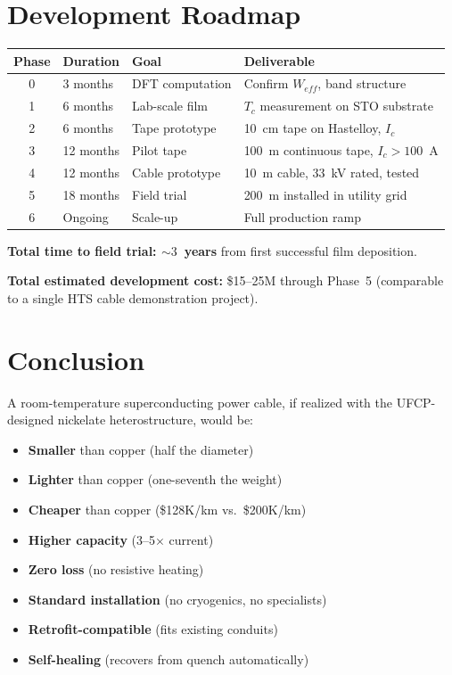 \documentclass[11pt, a4paper]{article}
\begin{document}
\section{Development Roadmap}
\label{sec:roadmap}

\begin{center}
\begin{tabular}{@{}clll@{}}
\toprule
\textbf{Phase} & \textbf{Duration} & \textbf{Goal} & \textbf{Deliverable} \\
\midrule
0 & 3 months & DFT computation & Confirm $W_{eff}$, band structure \\
1 & 6 months & Lab-scale film & $T_c$ measurement on STO substrate \\
2 & 6 months & Tape prototype & 10~cm tape on Hastelloy, $I_c$ \\
3 & 12 months & Pilot tape & 100~m continuous tape, $I_c > 100$~A \\
4 & 12 months & Cable prototype & 10~m cable, 33~kV rated, tested \\
5 & 18 months & Field trial & 200~m installed in utility grid \\
6 & Ongoing & Scale-up & Full production ramp \\
\bottomrule
\end{tabular}
\end{center}

\textbf{Total time to field trial: $\sim 3$~years} from first
successful film deposition.

\textbf{Total estimated development cost:} \$15--25M through Phase~5
(comparable to a single HTS cable demonstration project).

\section{Conclusion}

A room-temperature superconducting power cable, if realized with
the UFCP-designed nickelate heterostructure, would be:

\begin{itemize}[nosep]
  \item \textbf{Smaller} than copper (half the diameter)
  \item \textbf{Lighter} than copper (one-seventh the weight)
  \item \textbf{Cheaper} than copper (\$128K/km vs.\ \$200K/km)
  \item \textbf{Higher capacity} (3--5$\times$ current)
  \item \textbf{Zero loss} (no resistive heating)
  \item \textbf{Standard installation} (no cryogenics, no specialists)
  \item \textbf{Retrofit-compatible} (fits existing conduits)
  \item \textbf{Self-healing} (recovers from quench automatically)
\end{itemize}
\end{document}
